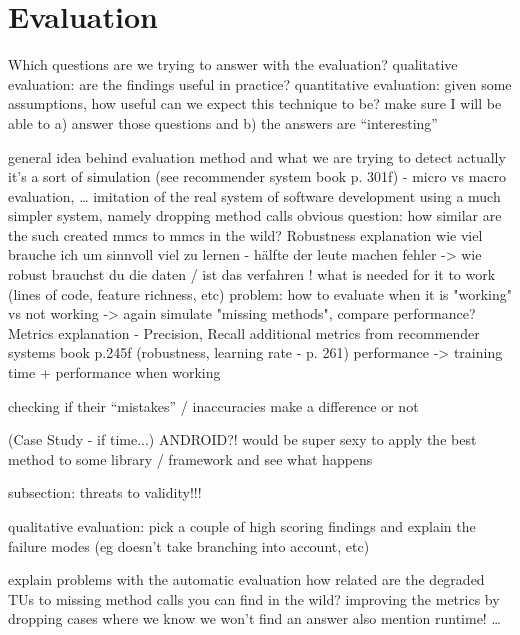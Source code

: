 \chapter{Evaluation}
Which questions are we trying to answer with the evaluation?
    qualitative evaluation: are the findings useful in practice?
    quantitative evaluation: given some assumptions, how useful can we expect this technique to be?
    make sure I will be able to a) answer those questions and b) the answers are ``interesting''

general idea behind evaluation method and what we are trying to detect
actually it's a sort of simulation (see recommender system book p. 301f) - micro vs macro evaluation, \ldots
    imitation of the real system of software development
    using a much simpler system, namely dropping method calls
    obvious question: how similar are the such created mmcs to mmcs in the wild?
Robustness explanation
    wie viel brauche ich um sinnvoll viel zu lernen - hälfte der leute machen fehler -> wie robust brauchst du die daten / ist das verfahren !
    what is needed for it to work (lines of code, feature richness, etc) 
    problem: how to evaluate when it is "working" vs not working -> again simulate "missing methods", compare performance?
Metrics explanation - Precision, Recall
    additional metrics from recommender systems book p.245f (robustness, learning rate - p. 261)
    performance -> training time + performance when working


checking if their ``mistakes'' / inaccuracies make a difference or not

(Case Study - if time...)
    ANDROID?!
    would be super sexy to apply the best method to some library / framework and see what happens

subsection: threats to validity!!!

qualitative evaluation:
    pick a couple of high scoring findings and explain the failure modes (eg doesn't take branching into account, etc)

explain problems with the automatic evaluation
    how related are the degraded TUs to missing method calls you can find in the wild?
    improving the metrics by dropping cases where we know we won't find an answer
    also mention runtime!
    \ldots
